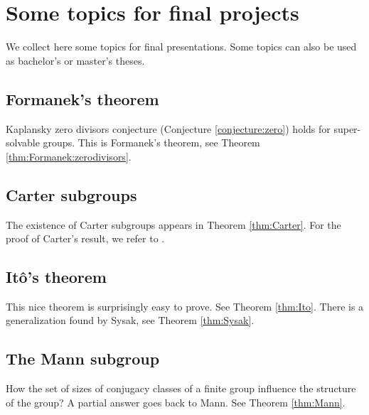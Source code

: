 \section*{Some topics for final projects}

\fancyhf{}
\fancyfoot[R]{\thepage}
\fancyhead[L]{\course}
\setlength{\headheight}{14pt}

We collect here some topics for final presentations. Some topics
can also be used as bachelor's or master's theses.

\subsection*{Formanek's theorem}

Kaplansky zero divisors conjecture (Conjecture \ref{conjecture:zero}) 
holds for super-solvable groups. 
This is Formanek's theorem, see Theorem \ref{thm:Formanek:zerodivisors}. 

\subsection*{Carter subgroups}

The existence of Carter subgroups appears in Theorem \ref{thm:Carter}. For the proof of Carter's result, we refer to \cite{MR0123603}.

\subsection*{It\^o's theorem}

This nice theorem is surprisingly easy to prove. See Theorem \ref{thm:Ito}. There is a generalization
found by Sysak, see Theorem \ref{thm:Sysak}. 

\subsection*{The Mann subgroup}

How the set of sizes of conjugacy classes of a finite group influence 
the structure of the group? A partial answer goes back to Mann. See Theorem \ref{thm:Mann}. 

